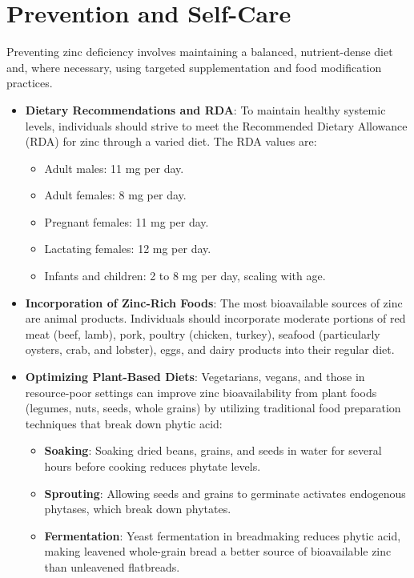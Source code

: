 \section*{Prevention and Self-Care}
Preventing zinc deficiency involves maintaining a balanced, nutrient-dense diet and, where necessary, using targeted supplementation and food modification practices.
\begin{itemize}
    \item \textbf{Dietary Recommendations and RDA}: To maintain healthy systemic levels, individuals should strive to meet the Recommended Dietary Allowance (RDA) for zinc through a varied diet. The RDA values are:
    \begin{itemize}
        \item Adult males: 11 mg per day.
        \item Adult females: 8 mg per day.
        \item Pregnant females: 11 mg per day.
        \item Lactating females: 12 mg per day.
        \item Infants and children: 2 to 8 mg per day, scaling with age.
    \end{itemize}
    \item \textbf{Incorporation of Zinc-Rich Foods}: The most bioavailable sources of zinc are animal products. Individuals should incorporate moderate portions of red meat (beef, lamb), pork, poultry (chicken, turkey), seafood (particularly oysters, crab, and lobster), eggs, and dairy products into their regular diet.
    \item \textbf{Optimizing Plant-Based Diets}: Vegetarians, vegans, and those in resource-poor settings can improve zinc bioavailability from plant foods (legumes, nuts, seeds, whole grains) by utilizing traditional food preparation techniques that break down phytic acid:
    \begin{itemize}
        \item \textbf{Soaking}: Soaking dried beans, grains, and seeds in water for several hours before cooking reduces phytate levels.
        \item \textbf{Sprouting}: Allowing seeds and grains to germinate activates endogenous phytases, which break down phytates.
        \item \textbf{Fermentation}: Yeast fermentation in breadmaking reduces phytic acid, making leavened whole-grain bread a better source of bioavailable zinc than unleavened flatbreads.
    \end{itemize}

\end{itemize}
